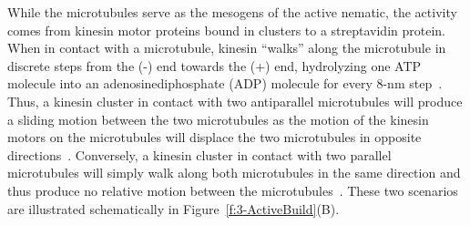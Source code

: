 While the microtubules serve as the mesogens of the active nematic, the activity comes from kinesin motor proteins bound in clusters to a streptavidin protein.
When in contact with a microtubule, kinesin ``walks'' along the microtubule in discrete steps from the (-) end towards the (+) end, hydrolyzing one ATP molecule into an adenosinediphosphate (ADP) molecule for every 8-nm step~\cite{RN250}.
Thus, a kinesin cluster in contact with two antiparallel microtubules will produce a sliding motion between the two microtubules as the motion of the kinesin motors on the microtubules will displace the two microtubules in opposite directions~\cite{RN4,RN3}.
Conversely, a kinesin cluster in contact with two parallel microtubules will simply walk along both microtubules in the same direction and thus produce no relative motion between the microtubules~\cite{RN4,RN3}. These two scenarios are illustrated schematically in Figure~\ref{f:3-ActiveBuild}(B).
